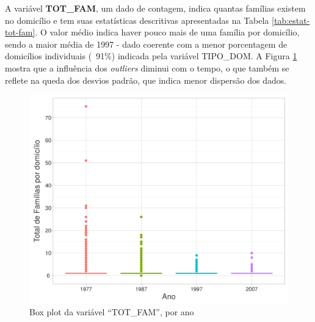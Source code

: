 \begin{table}[htb]
\centering

\end{table}

A variável \textbf{TOT_FAM}, um dado de contagem, indica quantas famílias existem no domicílio e tem suas estatísticas descritivas apresentadas na Tabela \ref{tab:estat-tot-fam}. O valor médio indica haver pouco mais de uma família por domicílio, sendo a maior média de 1997 - dado coerente com a menor porcentagem de domicílios individuais (~91\%) indicada pela variável TIPO_DOM. A Figura \ref{fig:box-plot-tot-fam} mostra que a influência dos \textit{outliers} diminui com o tempo, o que também se reflete na queda dos desvios padrão, que indica menor dispersão dos dados.


\begin{figure}[htb]%
    \caption{\label{fig:box-plot-tot-fam}Box plot da variável ``TOT_FAM'', por ano}%
    \begin{center}%
        \includegraphics[width=1\textwidth]{./imagens/box-plot-tot-fam.png}%
    \end{center}%
\end{figure}%

